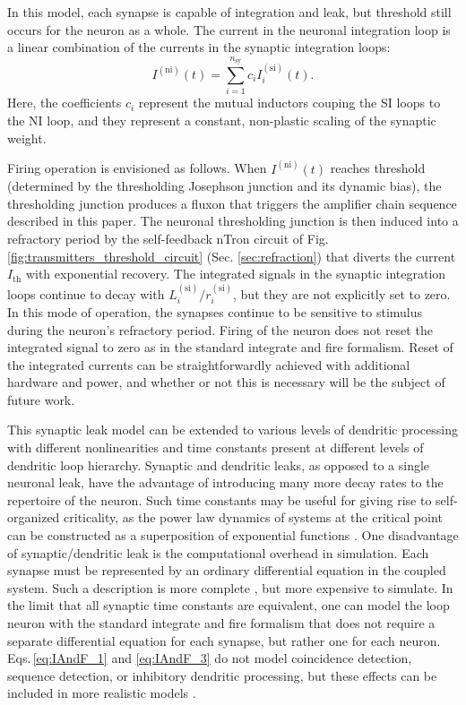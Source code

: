 \documentclass[twocolumn]{article}
\begin{document}
In this model, each synapse is capable of integration and leak, but threshold still occurs for the neuron as a whole. The current in the neuronal integration loop is a linear combination of the currents in the synaptic integration loops:
\begin{equation}
\label{eq:IAndF_3}
I^{(\mathrm{ni})}(t) = \sum_{i = 1}^{n_{\mathrm{sy}}} c_i I_i^{(\mathrm{si})}(t).
\end{equation}
Here, the coefficients $c_i$ represent the mutual inductors couping the SI loops to the NI loop, and they represent a constant, non-plastic scaling of the synaptic weight.

Firing operation is envisioned as follows. When $I^{(\mathrm{ni})}(t)$ reaches threshold (determined by the thresholding Josephson junction and its dynamic bias), the thresholding junction produces a fluxon that triggers the amplifier chain sequence described in this paper. The neuronal thresholding junction is then induced into a refractory period by the self-feedback nTron circuit of Fig.\,\ref{fig:transmitters_threshold_circuit} (Sec. \ref{sec:refraction}) that diverts the current $I_{\mathrm{th}}$ with exponential recovery. The integrated signals in the synaptic integration loops continue to decay with $L_i^{(\mathrm{si})}/r_i^{(\mathrm{si})}$, but they are not explicitly set to zero. In this mode of operation, the synapses continue to be sensitive to stimulus during the neuron's refractory period. Firing of the neuron does not reset the integrated signal to zero as in the standard integrate and fire formalism. Reset of the integrated currents can be straightforwardly achieved with additional hardware and power, and whether or not this is necessary will be the subject of future work.

This synaptic leak model can be extended to various levels of dendritic processing with different nonlinearities and time constants present at different levels of dendritic loop hierarchy. Synaptic and dendritic leaks, as opposed to a single neuronal leak, have the advantage of introducing many more decay rates to the repertoire of the neuron. Such time constants may be useful for giving rise to self-organized criticality, as the power law dynamics of systems at the critical point can be constructed as a superposition of exponential functions \cite{fudr2005,be2007}. One disadvantage of synaptic/dendritic leak is the computational overhead in simulation. Each synapse must be represented by an ordinary differential equation in the coupled system. Such a description is more complete \cite{abre2004}, but more expensive to simulate. In the limit that all synaptic time constants are equivalent, one can model the loop neuron with the standard integrate and fire formalism that does not require a separate differential equation for each synapse, but rather one for each neuron. Eqs.\,\ref{eq:IAndF_1} and \ref{eq:IAndF_3} do not model coincidence detection, sequence detection, or inhibitory dendritic processing, but these effects can be included in more realistic models \cite{geki2002}.
	
\end{document}
